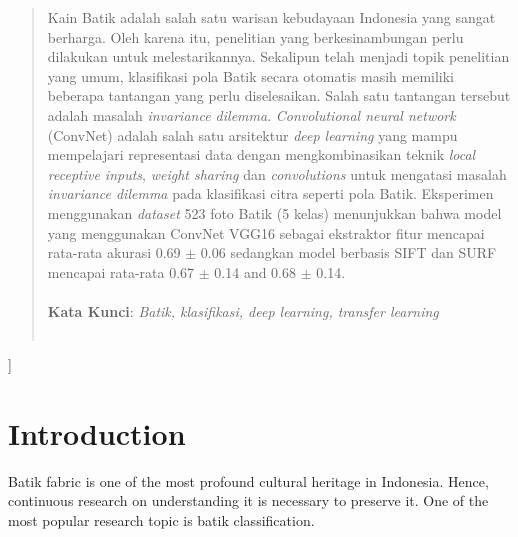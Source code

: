 \documentclass[conference, compsoc]{IEEEtran}
\begin{document}
{	\renewcommand{\abstractname}{Abstrak}
	\begin{abstract}
		\noindent
		\normalfont 
		Kain Batik adalah salah satu warisan kebudayaan Indonesia yang sangat berharga. Oleh karena itu, penelitian yang berkesinambungan perlu dilakukan untuk melestarikannya. Sekalipun telah menjadi topik penelitian yang umum, klasifikasi pola Batik secara otomatis masih memiliki beberapa tantangan yang perlu diselesaikan. Salah satu tantangan tersebut adalah masalah \textit{invariance dilemma}. \textit{Convolutional neural network} (ConvNet) adalah salah satu arsitektur \textit{deep learning} yang mampu mempelajari representasi data dengan mengkombinasikan teknik \textit{local receptive inputs}, \textit{weight sharing} dan \textit{convolutions} untuk mengatasi masalah \textit{invariance dilemma} pada klasifikasi citra seperti pola Batik. Eksperimen menggunakan \textit{dataset} 523 foto Batik (5 kelas) menunjukkan bahwa model yang menggunakan ConvNet VGG16 sebagai ekstraktor fitur mencapai rata-rata akurasi 0.69 $\pm$ 0.06 sedangkan model berbasis SIFT dan SURF mencapai rata-rata 0.67 $\pm$ 0.14 and 0.68 $\pm$ 0.14.
		\\\\
		\noindent
		\textbf{Kata Kunci}: \textit{Batik, klasifikasi, deep learning, transfer learning} \\\\
	\end{abstract}
	
}
]

%
\IEEEpeerreviewmaketitle

\section{Introduction}

Batik fabric is one of the most profound cultural heritage in Indonesia. Hence, continuous research on understanding it is necessary to preserve it. One of the most popular research topic is batik classification.
\end{document}
